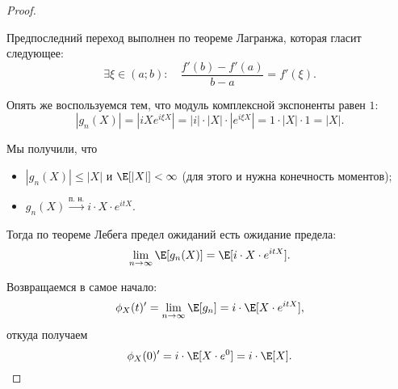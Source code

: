 \begin{proof}
\begin{itemize}
        Предпоследний переход выполнен по теореме Лагранжа, которая гласит следующее:
        \begin{equation*}
            \exists \xi \in (a; b): \quad \dfrac{f'(b) - f'(a)}{b - a} = f'(\xi).
        \end{equation*}

        Опять же воспользуемся тем, что модуль комплексной экспоненты равен $1$:
        \begin{equation*}
            |g_n(X)| 
            = \left|iX e^{i \xi X}\right|
            = |i| \cdot |X| \cdot \left|e^{i \xi X}\right|
            = 1 \cdot |X| \cdot 1
            = |X|.
        \end{equation*}
    \end{itemize}

    Мы получили, что
    \begin{itemize}
    \item 
        $|g_n(X)| \leq |X|$ и $\E[|X|] < \infty$ (для этого и нужна конечность моментов);

    \item 
        $g_n(X) \xrightarrow{\text{п. н.}} i \cdot X \cdot e^{itX}$.
    \end{itemize}

    Тогда по теореме Лебега предел ожиданий есть ожидание предела:
    \begin{equation*}
        \lim_{n \to \infty} \E[g_n(X)] = \E[i \cdot X \cdot e^{itX}].
    \end{equation*}

    Возвращаемся в самое начало:
    \begin{equation*}
        \phi_X(t)' = \lim_{n \to \infty} \E[g_n] = i \cdot \E[X \cdot e^{itX}],
    \end{equation*}
    откуда получаем
    \begin{equation*}
        \phi_X(0)' = i \cdot \E[X \cdot e^{0}] = i \cdot \E[X].
    \end{equation*}
\end{proof} 